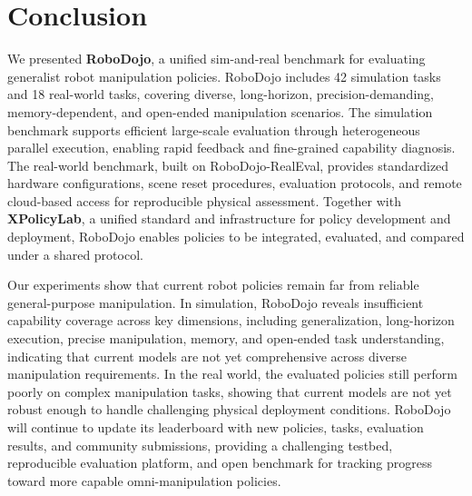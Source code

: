 \section{Conclusion}
\label{sec:conclusion}

We presented \textbf{RoboDojo}, a unified sim-and-real benchmark for evaluating generalist robot manipulation policies. RoboDojo includes 42 simulation tasks and 18 real-world tasks, covering diverse, long-horizon, precision-demanding, memory-dependent, and open-ended manipulation scenarios. The simulation benchmark supports efficient large-scale evaluation through heterogeneous parallel execution, enabling rapid feedback and fine-grained capability diagnosis. The real-world benchmark, built on RoboDojo-RealEval, provides standardized hardware configurations, scene reset procedures, evaluation protocols, and remote cloud-based access for reproducible physical assessment. Together with \textbf{XPolicyLab}, a unified standard and infrastructure for policy development and deployment, RoboDojo enables policies to be integrated, evaluated, and compared under a shared protocol.

Our experiments show that current robot policies remain far from reliable general-purpose manipulation. In simulation, RoboDojo reveals insufficient capability coverage across key dimensions, including generalization, long-horizon execution, precise manipulation, memory, and open-ended task understanding, indicating that current models are not yet comprehensive across diverse manipulation requirements. In the real world, the evaluated policies still perform poorly on complex manipulation tasks, showing that current models are not yet robust enough to handle challenging physical deployment conditions. RoboDojo will continue to update its leaderboard with new policies, tasks, evaluation results, and community submissions, providing a challenging testbed, reproducible evaluation platform, and open benchmark for tracking progress toward more capable omni-manipulation policies.
